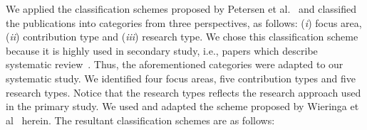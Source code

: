 We applied the classification schemes proposed by Petersen et al.~\cite{Petersen:2008:SMS:2227115.2227123} and classified the publications into categories from three perspectives, as follows: (\textit{i}) focus area, (\textit{ii}) contribution type and (\textit{iii}) research type. We chose this classification scheme because it is highly used in secondary study, i.e., papers which describe systematic review~\cite{Durelli:2013:SRM:2480362.2480567}.%
 Thus, the aforementioned categories were adapted to our systematic study. We identified four focus areas, five contribution types and five research types. Notice that the research types reflects the research approach used in the primary study. We used and adapted the scheme proposed by Wieringa et al~\cite{Wieringa:2005:REP:1107677.1107683} herein. The resultant classification schemes are as follows:

